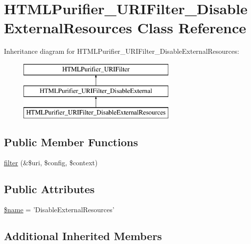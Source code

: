 \hypertarget{classHTMLPurifier__URIFilter__DisableExternalResources}{\section{H\+T\+M\+L\+Purifier\+\_\+\+U\+R\+I\+Filter\+\_\+\+Disable\+External\+Resources Class Reference}
\label{classHTMLPurifier__URIFilter__DisableExternalResources}
}
Inheritance diagram for H\+T\+M\+L\+Purifier\+\_\+\+U\+R\+I\+Filter\+\_\+\+Disable\+External\+Resources\+:\begin{figure}[H]
\begin{center}
\leavevmode
\includegraphics[height=3.000000cm]{classHTMLPurifier__URIFilter__DisableExternalResources}
\end{center}
\end{figure}
\subsection*{Public Member Functions}
\begin{DoxyCompactItemize}
\item 
\hyperlink{classHTMLPurifier__URIFilter__DisableExternalResources_a69f6726cac9c229be1a8828c220fdde1}{filter} (\&\$uri, \$config, \$context)
\end{DoxyCompactItemize}
\subsection*{Public Attributes}
\begin{DoxyCompactItemize}
\item 
\hyperlink{classHTMLPurifier__URIFilter__DisableExternalResources_ab675354fe206ee9f5c1e4bca62488343}{\$name} = 'Disable\+External\+Resources'
\end{DoxyCompactItemize}
\subsection*{Additional Inherited Members}


